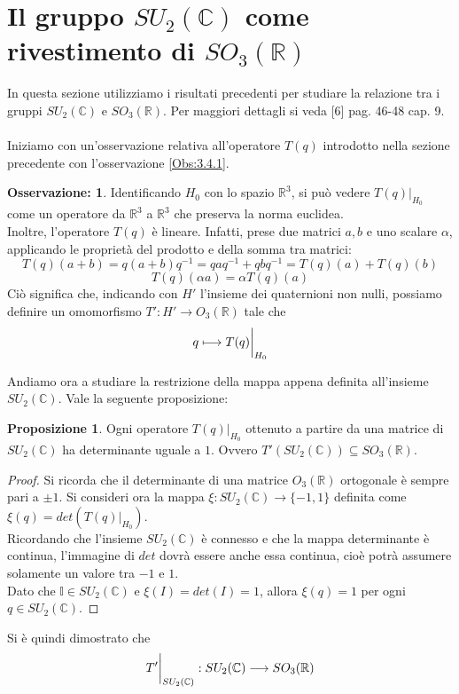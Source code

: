 \documentclass[12pt,a4paper]{report}
\theoremstyle{definition}
\theoremstyle{Theorem}
\newtheorem{Prop}[Def]{Proposizione}
\theoremstyle{definition}
\theoremstyle{definition}
\theoremstyle{definition}
\newtheorem{Obs}[Def]{Osservazione:}
\begin{document}
\section{Il gruppo $SU_2(\mathbb{C})$ come rivestimento di $SO_3(\mathbb{R})$}
In questa sezione utilizziamo i risultati precedenti per studiare la relazione tra i gruppi $SU_2(\mathbb{C})$ e $SO_3(\mathbb{R})$. Per maggiori dettagli si veda [6] pag. 46-48 cap. 9.\\
\\
Iniziamo con un'osservazione relativa all'operatore $T(q)$ introdotto nella sezione precedente con l'osservazione \ref{Obs:3.4.1}.
\begin{Obs}
	Identificando $H_0$ con lo spazio $\mathbb{R}^3$, si può vedere $T(q)|_{H_0}$ come un operatore da $\mathbb{R}^3$ a $\mathbb{R}^3$ che preserva la norma euclidea.\\
	Inoltre, l'operatore $T(q)$ è lineare. Infatti, prese due matrici $a,b$ e uno scalare $\alpha$, applicando le proprietà del prodotto e della somma tra matrici: $$T(q)(a+b)=q(a+b)q^{-1}=qaq^{-1}+qbq^{-1}=T(q)(a)+T(q)(b)
	$$
	$$T(q)(\alpha a)=\alpha T(q)(a)$$
	Ciò significa che, indicando con $H'$ l'insieme dei quaternioni non nulli, possiamo definire un omomorfismo $T':H'\rightarrow O_3(\mathbb{R})$ tale che
	$$q\longmapsto T(q)\bigg{\rvert}_{H_0}$$
\end{Obs}
Andiamo ora a studiare la restrizione della mappa appena definita all'insieme $SU_2(\mathbb{C})$. Vale la seguente proposizione:
\begin{Prop}
	Ogni operatore $T(q)|_{H_0}$ ottenuto a partire da una matrice di $SU_2(\mathbb{C})$ ha determinante uguale a $1$. Ovvero $T'(SU_2(\mathbb{C}))\subseteq SO_3(\mathbb{R})$. 
\end{Prop}
\begin{proof}
	Si ricorda che il determinante di una matrice $O_3(\mathbb{R})$ ortogonale è sempre pari a $\pm 1$.
	Si consideri ora la mappa $\xi:SU_2(\mathbb{C})\longrightarrow \{-1,1\}$ definita come $\xi(q)=det(T(q)|_{H_0})$.\\
	Ricordando che l'insieme $SU_2(\mathbb{C})$ è connesso e che la mappa determinante è continua, l'immagine di $det$ dovrà essere anche essa continua, cioè potrà assumere solamente un valore tra $-1$ e $1$.\\
	Dato che $\mathbb{I}\in SU_2(\mathbb{C})$ e $\xi(I)=det(I)=1$, allora $\xi(q)=1$ per ogni $q\in SU_2(\mathbb{C})$.
\end{proof}
Si è quindi dimostrato che 
$$T'\bigg{\rvert}_{SU_2(\mathbb{C})}:SU_2(\mathbb{C})\longrightarrow SO_3(\mathbb{R})$$
\end{document}
